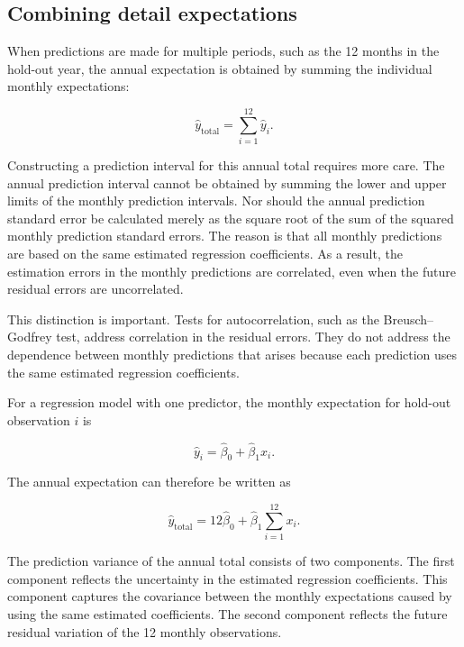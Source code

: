 \subsection{Combining detail expectations} %
\label{sub:combining_detail_expectations}

When predictions are made for multiple periods, such as the 12 months in the hold-out year, the annual expectation is obtained by summing the individual monthly expectations:

\begin{equation}
\label{eq:annual_expectation}
\hat{y}_{\text{total}} = \sum_{i=1}^{12} \hat{y}_i.
\end{equation}

Constructing a prediction interval for this annual total requires more care. The annual prediction interval cannot be obtained by summing the lower and upper limits of the monthly prediction intervals. Nor should the annual prediction standard error be calculated merely as the square root of the sum of the squared monthly prediction standard errors. The reason is that all monthly predictions are based on the same estimated regression coefficients. As a result, the estimation errors in the monthly predictions are correlated, even when the future residual errors are uncorrelated.

This distinction is important. Tests for autocorrelation, such as the Breusch--Godfrey test, address correlation in the residual errors. They do not address the dependence between monthly predictions that arises because each prediction uses the same estimated regression coefficients.

For a regression model with one predictor, the monthly expectation for hold-out observation $i$ is

\begin{equation}
\label{eq:monthly_expectation}
\hat{y}_i = \hat{\beta}_0 + \hat{\beta}_1 x_i.
\end{equation}

The annual expectation can therefore be written as

\begin{equation}
\label{eq:annual_expectation_one_predictor}
\hat{y}_{\text{total}} = 12\hat{\beta}_0 + \hat{\beta}_1 \sum_{i=1}^{12} x_i.
\end{equation}

\medskip
The prediction variance of the annual total consists of two components. The first component reflects the uncertainty in the estimated regression coefficients. This component captures the covariance between the monthly expectations caused by using the same estimated coefficients. The second component reflects the future residual variation of the 12 monthly observations.

